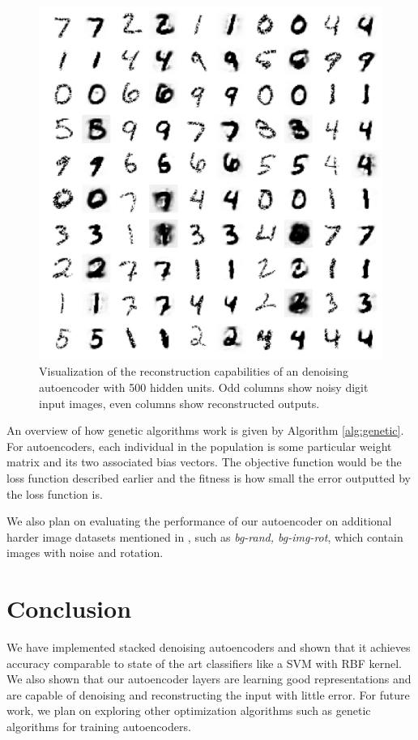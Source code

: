 \documentclass[conference]{IEEEtran}
\begin{document}
\begin{figure}[h]
\centering
\includegraphics[width=0.8\linewidth]{experiment3_2.png}
\caption{Visualization of the reconstruction capabilities of an denoising autoencoder with 500 hidden units. Odd columns show noisy digit input images, even columns show reconstructed outputs.}
\label{fig:experiment3_2}
\end{figure}

An overview of how genetic algorithms work is given by Algorithm \ref{alg:genetic}. For autoencoders, each individual in the population is some particular weight matrix and its two associated bias vectors. The objective function would be the loss function described earlier and the fitness is how small the error outputted by the loss function is. 

We also plan on evaluating the performance of our autoencoder on additional harder image datasets mentioned in \cite{vincent2010stacked}, such as \textit{bg-rand, bg-img-rot}, which contain images with noise and rotation. 

\section{Conclusion}
We have implemented stacked denoising autoencoders and shown that it achieves accuracy comparable to state of the art classifiers like a SVM with RBF kernel. We also shown that our autoencoder layers are learning good representations and are capable of denoising and reconstructing the input with little error. For future work, we plan on exploring other optimization algorithms such as genetic algorithms for training autoencoders. 
\end{document}
